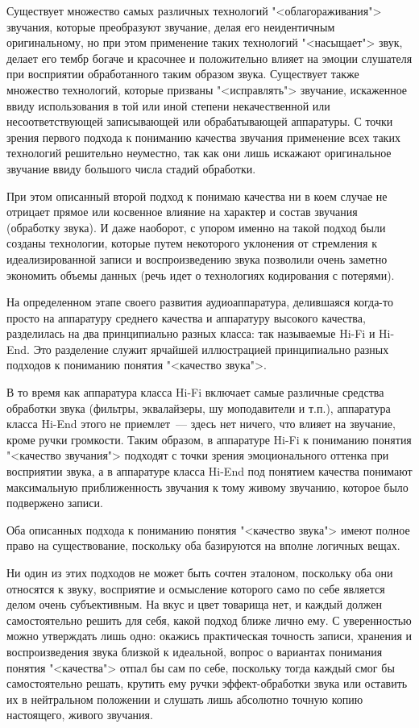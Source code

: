 \documentclass[oneside, final, 14pt]{extreport}
\begin{document}
Существует множество самых различных технологий "<облагораживания"> звучания, которые преобразуют звучание, делая его неидентичным оригинальному, но при этом применение таких технологий "<насыщает"> звук, делает его тембр богаче и красочнее и положительно влияет на эмоции слушателя при восприятии обработанного таким образом звука. Существует также множество технологий, которые призваны "<исправлять"> звучание, искаженное ввиду использования в той или иной степени некачественной или несоответствующей записывающей или обрабатывающей аппаратуры. С точки зрения первого подхода к пониманию качества звучания применение всех таких технологий решительно неуместно, так как они
лишь искажают оригинальное звучание ввиду большого числа стадий обработки. 

При этом описанный второй подход к понимаю качества ни в коем случае не отрицает прямое или косвенное влияние на характер и состав звучания (обработку звука). И даже наоборот, с упором именно на такой подход были созданы технологии, которые путем некоторого уклонения от стремления к идеализированной записи и воспроизведению звука позволили очень заметно экономить объемы данных (речь идет о технологиях кодирования с потерями).

На определенном этапе своего развития аудиоаппаратура, делившаяся когда-то просто на аппаратуру среднего качества и аппаратуру высокого качества, разделилась на два принципиально разных класса: так называемые Hi-Fi и Hi-End. Это
разделение служит ярчайшей иллюстрацией принципиально разных подходов к пониманию понятия "<качество звука">. 

В то время как аппаратура класса Hi-Fi включает самые различные средства обработки звука (фильтры, эквалайзеры, шу
моподавители и т.п.), аппаратура класса Hi-End этого не приемлет~--- здесь нет ничего, что влияет на звучание, кроме ручки громкости. Таким образом, в аппаратуре Hi-Fi к пониманию понятия "<качество звучания"> подходят с точки зрения эмоционального оттенка при восприятии звука, а в аппаратуре класса Hi-End под понятием качества понимают максимальную приближенность звучания к тому живому звучанию, которое было подвержено записи.

Оба описанных подхода к пониманию понятия "<качество звука"> имеют полное право на существование, поскольку оба базируются на вполне логичных вещах. 

Ни один из этих подходов не может быть сочтен эталоном, поскольку оба они относятся к звуку, восприятие и осмысление которого само по себе является делом очень субъективным. На вкус и цвет товарища нет, и каждый должен самостоятельно решить для себя, какой подход ближе лично ему. С уверенностью можно утверждать лишь одно: окажись практическая точность записи, хранения и воспроизведения звука близкой к идеальной, вопрос о вариантах понимания понятия "<качества"> отпал бы сам по себе, поскольку тогда каждый смог бы самостоятельно решать, крутить ему ручки эффект-обработки звука или оставить их в нейтральном положении и слушать лишь абсолютно точную копию настоящего, живого звучания.
\end{document}
